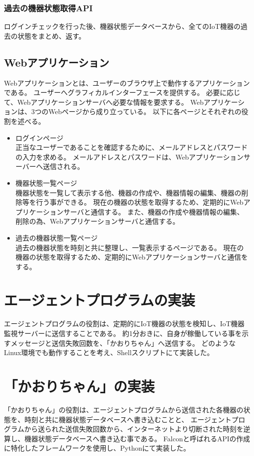 \subsubsection{過去の機器状態取得API}
ログインチェックを行った後、機器状態データベースから、全てのIoT機器の過去の状態をまとめ、返す。

\subsection{Webアプリケーション}
Webアプリケーションとは、ユーザーのブラウザ上で動作するアプリケーションである。
ユーザーへグラフィカルインターフェースを提供する。
必要に応じて、Webアプリケーションサーバへ必要な情報を要求する。
Webアプリケーションは、3つのWebページから成り立っている。
以下に各ページとそれぞれの役割を述べる。
\begin{itemize}
	\item ログインページ\\
		正当なユーザーであることを確認するために、メールアドレスとパスワードの入力を求める。
		メールアドレスとパスワードは、Webアプリケーションサーバーへ送信される。
	\item 機器状態一覧ページ\\
		機器状態を一覧して表示する他、機器の作成や、機器情報の編集、機器の削除等を行う事ができる。
		現在の機器の状態を取得するため、定期的にWebアプリケーションサーバと通信する。
		また、機器の作成や機器情報の編集、削除の為、Webアプリケーションサーバと通信する。
	\item 過去の機器状態一覧ページ\\
		過去の機器状態を時刻と共に整理し、一覧表示するページである。
		現在の機器の状態を取得するため、定期的にWebアプリケーションサーバと通信をする。
\end{itemize}

\section{エージェントプログラムの実装}
エージェントプログラムの役割は、定期的にIoT機器の状態を検知し、IoT機器監視サーバーに送信することである。
約1分おきに、自身が稼働している事を示すメッセージと送信失敗回数を、「かおりちゃん」へ送信する。
どのようなLinux環境でも動作することを考え、Shellスクリプトにて実装した。

\section{「かおりちゃん」の実装}
「かおりちゃん」の役割は、エージェントプログラムから送信された各機器の状態を、時刻と共に機器状態データベースへ書き込むことと、
エージェントプログラムから送られた送信失敗回数から、インターネットより切断された時刻を逆算し、機器状態データベースへ書き込む事である。
Falconと呼ばれるAPIの作成に特化したフレームワークを使用し、Pythonにて実装した。

